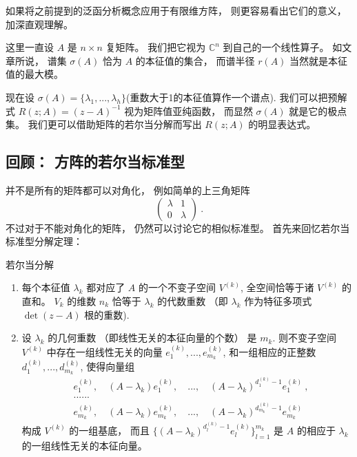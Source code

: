 

如果将之前提到的泛函分析概念应用于有限维方阵， 则更容易看出它们的意义， 加深直观理解。 

这里一直设 $A$ 是 $n\times n$ 复矩阵。 我们把它视为 $\mathbb{C}^n$ 到自己的一个线性算子。 如文章所说， 谱集 $\sigma(A)$ 恰为 $A$ 的本征值的集合， 而谱半径 $r(A)$ 当然就是本征值的最大模。 

现在设 $\sigma(A)=\{\lambda_1,...,\lambda_h\}$(重数大于1的本征值算作一个谱点). 我们可以把预解式 $R(z;A)=(z-A)^{-1}$ 视为矩阵值亚纯函数， 而显然 $\sigma(A)$ 就是它的极点集。 我们更可以借助矩阵的若尔当分解而写出 $R(z;A)$ 的明显表达式。 

\subsection{回顾： 方阵的若尔当标准型}
并不是所有的矩阵都可以对角化， 例如简单的上三角矩阵
$$
\left(
\begin{matrix}
\lambda & 1 \\
0 & \lambda
\end{matrix}
\right)~.
$$
不过对于不能对角化的矩阵， 仍然可以讨论它的相似标准型。 首先来回忆若尔当标准型分解定理：

\begin{theorem}{若尔当分解}
\begin{enumerate}
\item 每个本征值 $\lambda_k$ 都对应了 $A$ 的一个不变子空间 $V^{(k)}$, 全空间恰等于诸 $V^{(k)}$ 的直和。 $V_k$ 的维数 $n_k$ 恰等于 $\lambda_k$ 的代数重数 （即 $\lambda_k$ 作为特征多项式 $\det(z-A)$ 根的重数).
\item 设 $\lambda_k$ 的几何重数 （即线性无关的本征向量的个数） 是 $m_k$. 则不变子空间 $V^{(k)}$ 中存在一组线性无关的向量 $e^{(k)}_1,...,e^{(k)}_{m_k}$, 和一组相应的正整数 $d^{(k)}_1,...,d^{(k)}_{m_k}$, 使得向量组
$$
\begin{aligned}
&e^{(k)}_1,\quad(A-\lambda_k)e^{(k)}_1,\quad...,\quad(A-\lambda_k)^{d^{(k)}_1-1}e^{(k)}_1~,\\
&......\\
&e^{(k)}_{m_k},\quad(A-\lambda_k)e^{(k)}_{m_k},\quad...,\quad(A-\lambda_k)^{d^{(k)}_{m_k}-1}e^{(k)}_{m_k}~
\end{aligned}
$$
构成 $V^{(k)}$ 的一组基底， 而且 $\{(A-\lambda_k)^{d^{(k)}_l-1}e^{(k)}_l\}_{l=1}^{m_k}$ 是 $A$ 的相应于 $\lambda_k$ 的一组线性无关的本征向量。
\end{enumerate}
\end{theorem}

